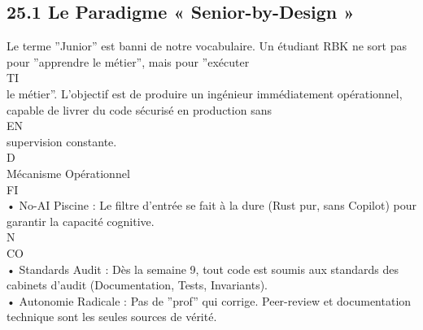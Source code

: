 \subsection{25.1 Le Paradigme « Senior-by-Design »}
Le terme ”Junior” est banni de notre vocabulaire. Un étudiant RBK ne sort pas pour ”apprendre le métier”, mais pour ”exécuter\\
\vspace{0.5em}
\vspace{0.5em}
\vspace{0.5em}
\vspace{0.5em}
TI\\
le métier”. L’objectif est de produire un ingénieur immédiatement opérationnel, capable de livrer du code sécurisé en production sans\\
\vspace{0.5em}
\vspace{0.5em}
\vspace{0.5em}
\vspace{0.5em}
EN\\
supervision constante.\\
\vspace{0.5em}
\vspace{0.5em}
\vspace{0.5em}
\vspace{0.5em}
D\\
Mécanisme Opérationnel\\
\vspace{0.5em}
\vspace{0.5em}
\vspace{0.5em}
\vspace{0.5em}
FI\\
• No-AI Piscine : Le filtre d’entrée se fait à la dure (Rust pur, sans Copilot) pour garantir la capacité cognitive.\\
\vspace{0.5em}
N\\
CO\\
• Standards Audit : Dès la semaine 9, tout code est soumis aux standards des cabinets d’audit (Documentation, Tests, Invariants).\\
\vspace{0.5em}
• Autonomie Radicale : Pas de ”prof” qui corrige. Peer-review et documentation technique sont les seules sources de vérité.\\
\vspace{0.5em}
\vspace{0.5em}
\vspace{0.5em}
